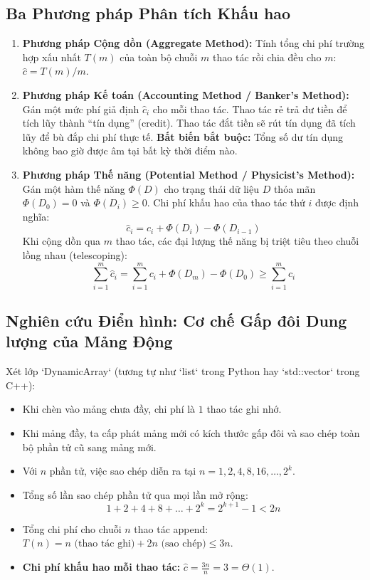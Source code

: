 \documentclass[11pt,a4paper]{article}
\begin{document}
\subsection{Ba Phương pháp Phân tích Khấu hao}
\begin{enumerate}[leftmargin=2.2em, itemsep=3pt]
    \item \textbf{Phương pháp Cộng dồn (Aggregate Method):} Tính tổng chi phí trường hợp xấu nhất $T(m)$ của toàn bộ chuỗi $m$ thao tác rồi chia đều cho $m$: $\hat{c} = T(m) / m$.
    \item \textbf{Phương pháp Kế toán (Accounting Method / Banker's Method):} Gán một mức phí giả định $\hat{c}_i$ cho mỗi thao tác. Thao tác rẻ trả dư tiền để tích lũy thành ``tín dụng'' (credit). Thao tác đắt tiền sẽ rút tín dụng đã tích lũy để bù đắp chi phí thực tế. \textbf{Bất biến bắt buộc:} Tổng số dư tín dụng không bao giờ được âm tại bất kỳ thời điểm nào.
    \item \textbf{Phương pháp Thế năng (Potential Method / Physicist's Method):} Gán một hàm thế năng $\Phi(D)$ cho trạng thái dữ liệu $D$ thỏa mãn $\Phi(D_0) = 0$ và $\Phi(D_i) \ge 0$. Chi phí khấu hao của thao tác thứ $i$ được định nghĩa:
    \[
    \hat{c}_i = c_i + \Phi(D_i) - \Phi(D_{i-1})
    \]
    Khi cộng dồn qua $m$ thao tác, các đại lượng thế năng bị triệt tiêu theo chuỗi lồng nhau (telescoping):
    \[
    \sum_{i=1}^m \hat{c}_i = \sum_{i=1}^m c_i + \Phi(D_m) - \Phi(D_0) \ge \sum_{i=1}^m c_i
    \]
\end{enumerate}

\subsection{Nghiên cứu Điển hình: Cơ chế Gấp đôi Dung lượng của Mảng Động}
Xét lớp `DynamicArray` (tương tự như `list` trong Python hay `std::vector` trong C++):
\begin{itemize}[itemsep=2pt]
    \item Khi chèn vào mảng chưa đầy, chi phí là $1$ thao tác ghi nhớ.
    \item Khi mảng đầy, ta cấp phát mảng mới có kích thước gấp đôi và sao chép toàn bộ phần tử cũ sang mảng mới.
    \item Với $n$ phần tử, việc sao chép diễn ra tại $n = 1, 2, 4, 8, 16, \dots, 2^k$.
    \item Tổng số lần sao chép phần tử qua mọi lần mở rộng:
    \[
    1 + 2 + 4 + 8 + \dots + 2^k = 2^{k+1} - 1 < 2n
    \]
    \item Tổng chi phí cho chuỗi $n$ thao tác append: $T(n) = n \text{ (thao tác ghi)} + 2n \text{ (sao chép)} \le 3n$.
    \item \textbf{Chi phí khấu hao mỗi thao tác:} $\hat{c} = \frac{3n}{n} = 3 = \Theta(1)$.
\end{itemize}
\end{document}
